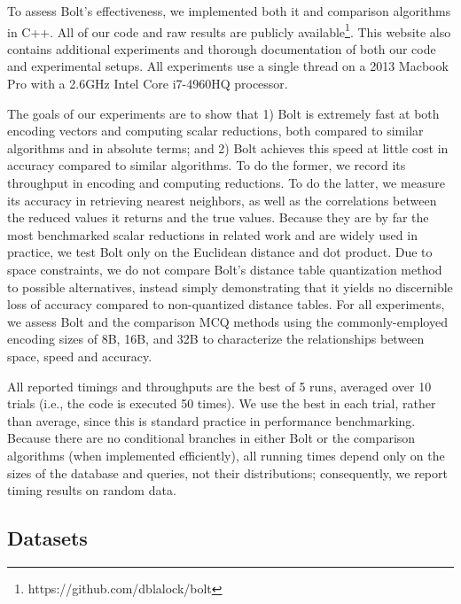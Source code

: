 
To assess Bolt's effectiveness, we implemented both it and comparison algorithms in C++. All of our code and raw results are publicly available\footnote{https://github.com/dblalock/bolt}. This website also contains additional experiments and thorough documentation of both our code and experimental setups. All experiments use a single thread on a 2013 Macbook Pro with a 2.6GHz Intel Core i7-4960HQ processor. %

The goals of our experiments are to show that 1) Bolt is extremely fast at both encoding vectors and computing scalar reductions, both compared to similar algorithms and in absolute terms; and 2) Bolt achieves this speed at little cost in accuracy compared to similar algorithms. To do the former, we record its throughput in encoding and computing reductions. To do the latter, we measure its accuracy in retrieving nearest neighbors, as well as the correlations between the reduced values it returns and the true values. Because they are by far the most benchmarked scalar reductions in related work and are widely used in practice, we test Bolt only on the Euclidean distance and dot product. Due to space constraints, we do not compare Bolt's distance table quantization method to possible alternatives, instead simply demonstrating that it yields no discernible loss of accuracy compared to non-quantized distance tables. For all experiments, we assess Bolt and the comparison MCQ methods using the commonly-employed encoding sizes of 8B, 16B, and 32B to characterize the relationships between space, speed and accuracy.

All reported timings and throughputs are the best of 5 runs, averaged over 10 trials (i.e., the code is executed 50 times). We use the best in each trial, rather than average, since this is standard practice in performance benchmarking. Because there are no conditional branches in either Bolt or the comparison algorithms (when implemented efficiently), all running times depend only on the sizes of the database and queries, not their distributions; consequently, we report timing results on random data.

\vspace{-2mm}
\subsection{Datasets}

